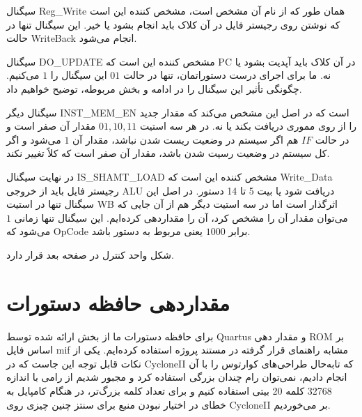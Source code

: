 \documentclass[12pt,titlepage,a4page , tikz , multi,table , svgnames,xcdraw]{article}
\begin{document}
\newpage

سیگنال Reg\_Write همان طور که از نام آن مشخص است، مشخص کننده این است که نوشتن روی رجیستر فایل در آن کلاک باید انجام بشود یا خیر. این سیگنال تنها در حالت WriteBack انجام می‌شود.

سیگنال DO\_UPDATE مشخص کننده این است که PC در آن کلاک باید آپدیت بشود یا نه. ما برای اجرای درست دستوراتمان، تنها در حالت $01$ این سیگنال را $1$ می‌کنیم. چگونگی تأثیر این سیگنال را در ادامه و بخش مربوطه، توضیح خواهیم داد.

سیگنال دیگر INST\_MEM\_EN است که در اصل این مشخص می‌کند که  مقدار جدید را از روی مموری دریافت بکند یا نه. در هر سه استیت $01,10,11$ مقدار آن صفر است و در حالت $IF$ هم اگر سیستم در وضعیت ریست شدن نباشد، مقدار آن $1$ می‌شود و اگر کل سیستم در وضعیت رسیت شدن باشد، مقدار آن صفر است که کلاً  تغییر نکند.

در نهایت سیگنال IS\_SHAMT\_LOAD مشخص کننده این است که Write\_Data رجیستر فایل باید از خروجی ALU دریافت شود یا بیت 5 تا 14 دستور. در اصل این سیگنال تنها در استیت WB اثرگذار است اما در سه استیت دیگر هم از آن جایی که می‌توان مقدار آن را مشخص کرد، آن را مقداردهی کرده‌ایم. این سیگنال تنها زمانی $1$ می‌شود که OpCode برابر $1000$ یعنی مربوط به دستور  باشد.


شکل واحد کنترل در صفحه بعد قرار دارد.


\begin{landscape}

\thispagestyle{empty}




\end{landscape}




\newpage

\section{مقداردهی حافظه دستورات}

برای حافظه دستورات ما از بخش  ارائه شده توسط Quartus و مقدار دهی ROM بر اساس فایل mif مشابه راهنمای قرار گرفته در مستند پروژه استفاده کرده‌ایم. یکی از نکات قابل توجه این جاست که در CycloneII که تابه‌حال طراحی‌های کوارتوس را با آن انجام دادیم، نمی‌توان رام چندان بزرگی استفاده کرد و مجبور شدیم از رامی با اندازه 32768 کلمه 20 بیتی استفاده کنیم و برای تعداد کلمه بزرگ‌تر، در هنگام کامپایل به خطای در اختیار نبودن منبع برای سنتز چنین چیزی روی CycloneII بر می‌خوردیم.
\end{document}

